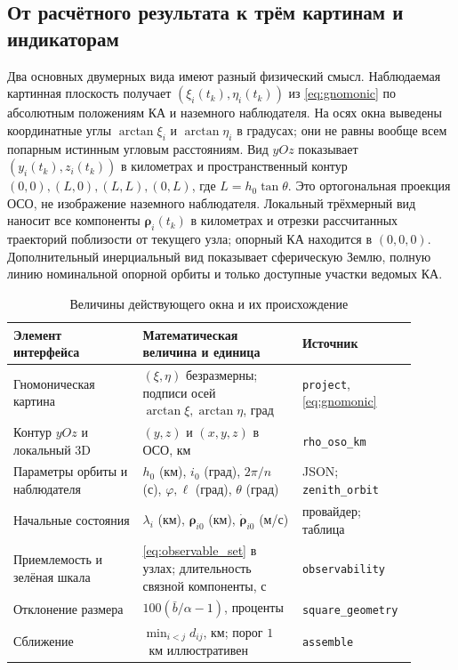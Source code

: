 \documentclass[a4paper,12pt]{article}
\begin{document}
\subsection{От расчётного результата к трём картинам и индикаторам}

Два основных двумерных вида имеют разный физический смысл.
Наблюдаемая картинная плоскость получает
$(\xi_i(t_k),\eta_i(t_k))$ из \eqref{eq:gnomonic}
по абсолютным положениям КА и наземного наблюдателя.
На осях окна выведены координатные углы
$\arctan\xi_i$ и $\arctan\eta_i$ в градусах;
они не равны вообще всем попарным истинным угловым
расстояниям. Вид $yOz$ показывает
$(y_i(t_k),z_i(t_k))$ в километрах и пространственный
контур $(0,0),(L,0),(L,L),(0,L)$, где $L=h_0\tan\theta$.
Это ортогональная проекция ОСО, не изображение наземного
наблюдателя. Локальный трёхмерный вид наносит все компоненты
$\boldsymbol\rho_i(t_k)$ в километрах и отрезки рассчитанных
траекторий поблизости от текущего узла; опорный КА
находится в $(0,0,0)$. Дополнительный инерциальный вид
показывает сферическую Землю, полную линию номинальной
опорной орбиты и только доступные участки ведомых КА.

\begin{table}[htbp]
\centering\small
\caption{Величины действующего окна и их происхождение}
\label{tab:interface_mapping}
\begin{tabular}{p{0.30\linewidth}p{0.37\linewidth}p{0.23\linewidth}}
\toprule
Элемент интерфейса & Математическая величина и единица &
Источник \\
\midrule
Гномоническая картина &
$(\xi,\eta)$ безразмерны; подписи осей
$\arctan\xi,\arctan\eta$, град &
\texttt{project}, \eqref{eq:gnomonic}\\
Контур $yOz$ и локальный 3D &
$(y,z)$ и $(x,y,z)$ в ОСО, км &
\texttt{rho\_oso\_km}\\
Параметры орбиты и наблюдателя &
$h_0$ (км), $i_0$ (град), $2\pi/n$ (с),
$\varphi,\ell$ (град), $\theta$ (град) &
JSON; \texttt{zenith\_orbit}\\
Начальные состояния &
$\lambda_i$ (км), $\boldsymbol\rho_{i0}$ (км),
$\dot{\boldsymbol\rho}_{i0}$ (м/с) &
провайдер; таблица\\
Приемлемость и зелёная шкала &
\eqref{eq:observable_set} в узлах;
длительность связной компоненты, с &
\texttt{observability}\\
Отклонение размера &
$100(\bar b/\alpha-1)$, проценты &
\texttt{square\_geometry}\\
Сближение &
$\min_{i<j}d_{ij}$, км; порог $1$~км
иллюстративен &
\texttt{assemble}\\
\bottomrule
\end{tabular}
\end{table}
\end{document}
